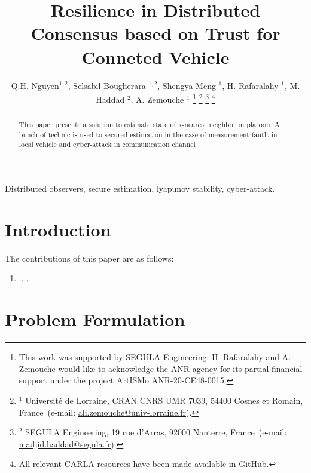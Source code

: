 \documentclass[letterpaper, 10pt, conference]{ieeeconf}  %
\begin{document}
\title{\bf Resilience in Distributed
 Consensus based on Trust for Conneted Vehicle }
\author{Q.H. Nguyen$^{1,2}$, Selsabil Bougherara $^{1,2}$, Shengya Meng $^{1}$, H. Rafaralahy $^{1}$, M. Haddad $^{2}$, A. Zemouche $^{1}$
%
\thanks{This work was supported by SEGULA Engineering. H. Rafaralahy and A. Zemouche would like to acknowledge the ANR agency for its partial financial support under the project ArtISMo ANR-20-CE48-0015.
}
%
\thanks{$^{1}$ Universit\'e de Lorraine, CRAN  CNRS UMR 7039, 54400 Cosnes et Romain, France~(e-mail: \protect\url{ali.zemouche@univ-lorraine.fr}).}
%
\thanks{$^{2}$ SEGULA Engineering, 19 rue d'Arras, 92000 Nanterre, France~(e-mail: \protect\url{madjid.haddad@segula.fr}).}
%
\thanks{All relevant CARLA resources have been made available in \protect\href{https://github.com/kslhuy/CACC_UIO_simulink}{GitHub}.}
}
\maketitle

\begin{abstract}
This paper presents a solution to estimate state of k-nearest neighbor in platoon. A bunch of technic is used to secured estimation in the case of measurement fautlt in local vehicle and cyber-attack in communication channel .
\end{abstract}

\begin{keywords}
Distributed observers, secure estimation, lyapunov stability, cyber-attack.
\end{keywords}

\section{Introduction}
    

The contributions of this paper are as follows:
\begin{enumerate}
\item ....
\end{enumerate}


\section{Problem Formulation}
\end{document}
